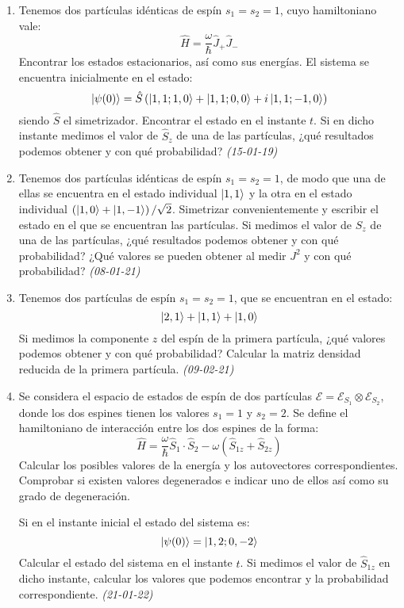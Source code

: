 \begin{enumerate}
    \item Tenemos dos partículas idénticas de espín \( s_1 = s_2 = 1 \), cuyo hamiltoniano vale:
    \[
    \hat{H} = \frac{\omega}{\hbar} \hat{J}_+ \hat{J}_-
    \]
    Encontrar los estados estacionarios, así como sus energías. El sistema se encuentra inicialmente en el estado:
    \[
    \ket{\psi(0)} = \hat{S} \left( \ket{1,1;1,0} + \ket{1,1;0,0} + i \ket{1,1;-1,0} \right)
    \]
    siendo \( \hat{S} \) el simetrizador. Encontrar el estado en el instante \( t \). Si en dicho instante medimos el valor de \( \hat{S}_z \) de una de las partículas, ¿qué resultados podemos obtener y con qué probabilidad? \textit{(15-01-19)}

    \item Tenemos dos partículas idénticas de espín \( s_1 = s_2 = 1 \), de modo que una de ellas se encuentra en el estado individual \( \ket{1,1} \) y la otra en el estado individual \( \left( \ket{1,0} + \ket{1,-1} \right)/\sqrt{2} \). Simetrizar convenientemente y escribir el estado en el que se encuentran las partículas. Si medimos el valor de \( S_z \) de una de las partículas, ¿qué resultados podemos obtener y con qué probabilidad? ¿Qué valores se pueden obtener al medir \( J^2 \) y con qué probabilidad? \textit{(08-01-21)}

    \item Tenemos dos partículas de espín \( s_1 = s_2 = 1 \), que se encuentran en el estado:
    \[
    \ket{2,1} + \ket{1,1} + \ket{1,0}
    \]
    Si medimos la componente \( z \) del espín de la primera partícula, ¿qué valores podemos obtener y con qué probabilidad? Calcular la matriz densidad reducida de la primera partícula. \textit{(09-02-21)}

    \item Se considera el espacio de estados de espín de dos partículas \( \mathcal{E} = \mathcal{E}_{S_1} \otimes \mathcal{E}_{S_2} \), donde los dos espines tienen los valores \( s_1 = 1 \) y \( s_2 = 2 \). Se define el hamiltoniano de interacción entre los dos espines de la forma:
    \[
    \hat{H} = \frac{\omega}{\hbar} \hat{S}_1 \cdot \hat{S}_2 - \omega (\hat{S}_{1z} + \hat{S}_{2z})
    \]
    Calcular los posibles valores de la energía y los autovectores correspondientes. Comprobar si existen valores degenerados e indicar uno de ellos así como su grado de degeneración.
    
    Si en el instante inicial el estado del sistema es:
    \[
    \ket{\psi (0)} = \ket{1, 2; 0, -2}
    \]
    Calcular el estado del sistema en el instante \( t \). Si medimos el valor de \( \hat{S}_{1z} \) en dicho instante, calcular los valores que podemos encontrar y la probabilidad correspondiente. \textit{(21-01-22)}


\end{enumerate}

